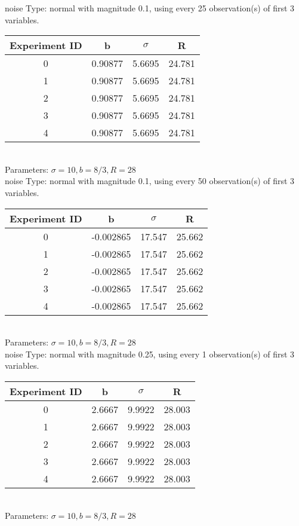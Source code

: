\begin{multicols}{3}
noise Type: normal with magnitude 0.1, using every 25 observation(s) of first 3 variables.\\
\begin{tabular}{cccc}
\hline Experiment ID & b & $\sigma$ & R \\ \hline 
0 & 0.90877 & 5.6695 & 24.781\\ \hline 
 1 & 0.90877 & 5.6695 & 24.781\\ \hline 
 2 & 0.90877 & 5.6695 & 24.781\\ \hline 
 3 & 0.90877 & 5.6695 & 24.781\\ \hline 
 4 & 0.90877 & 5.6695 & 24.781\\ \hline 
 \end{tabular}\\
Parameters: $\sigma=10, b=8/3, R=28$\\
noise Type: normal with magnitude 0.1, using every 50 observation(s) of first 3 variables.\\
\begin{tabular}{cccc}
\hline Experiment ID & b & $\sigma$ & R \\ \hline 
0 & -0.002865 & 17.547 & 25.662\\ \hline 
 1 & -0.002865 & 17.547 & 25.662\\ \hline 
 2 & -0.002865 & 17.547 & 25.662\\ \hline 
 3 & -0.002865 & 17.547 & 25.662\\ \hline 
 4 & -0.002865 & 17.547 & 25.662\\ \hline 
 \end{tabular}\\
Parameters: $\sigma=10, b=8/3, R=28$\\
noise Type: normal with magnitude 0.25, using every 1 observation(s) of first 3 variables.\\
\begin{tabular}{cccc}
\hline Experiment ID & b & $\sigma$ & R \\ \hline 
0 & 2.6667 & 9.9922 & 28.003\\ \hline 
 1 & 2.6667 & 9.9922 & 28.003\\ \hline 
 2 & 2.6667 & 9.9922 & 28.003\\ \hline 
 3 & 2.6667 & 9.9922 & 28.003\\ \hline 
 4 & 2.6667 & 9.9922 & 28.003\\ \hline 
 \end{tabular}\\
Parameters: $\sigma=10, b=8/3, R=28$\\

\end{multicols}

